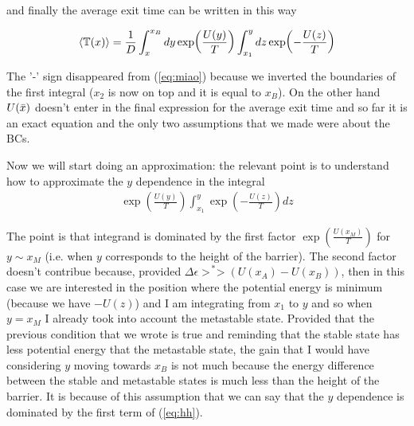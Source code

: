 \documentclass[\main/main.tex]{subfiles}
\begin{document}
and finally the average exit time can be written in this way

\begin{eqnarray}
    \left\langle \mathbb{T}(x) \right\rangle=\frac{1}{D}\int_x ^{x_B}dy\exp(\frac{U(y)}{T})\int_{x_1}^y dz \exp(-\frac{U(z)}{T})
\end{eqnarray}

The '-' sign disappeared from (\ref{eq:miao}) because we inverted the boundaries of the first integral ($x_2$ is now on top and it is equal to $x_B$). On the other hand $U(\Bar{x})$ doesn't enter in the final expression for the average exit time and so far it is an exact equation and the only two assumptions that we made were about the BCs.

Now we will start doing an approximation: the relevant point is to understand how to approximate the $y$ dependence in the integral
\begin{eqnarray}
\exp(\frac{U(y)}{T})\int_{x_1}^y \exp(-\frac{U(z)}{T})dz
\label{eq:hh}
\end{eqnarray}

The point is that integrand is dominated by the first factor $\exp(\frac{U(x_M)}{T})$ for $y\sim x_M$ (i.e. when $y$ corresponds to the height of the barrier). The second factor doesn't contribue because, provided $\Delta\epsilon\overset{*}{>>}(U(x_A)-U(x_B))$, then in this case we are interested in the position where the potential energy is minimum (because we have $-U(z)$) and I am integrating from $x_1$ to $y$ and so when $y=x_M$ I already took into account the metastable state. Provided that the previous condition that we wrote is true and reminding that the stable state has less potential energy that the metastable state, the gain that I would have considering $y$ moving towards $x_B$ is not much because the energy difference between the stable and metastable states is much less than the height of the barrier. It is because of this assumption that we can say that the $y$ dependence is dominated by the first term of (\ref{eq:hh}). 
\end{document}
